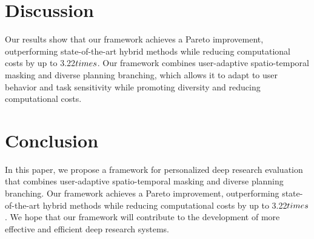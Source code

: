 \documentclass{article}
\begin{document}
\section{Discussion}

Our results show that our framework achieves a Pareto improvement, outperforming state-of-the-art hybrid methods while reducing computational costs by up to 3.22$\\times$. Our framework combines user-adaptive spatio-temporal masking and diverse planning branching, which allows it to adapt to user behavior and task sensitivity while promoting diversity and reducing computational costs.

\section{Conclusion}

In this paper, we propose a framework for personalized deep research evaluation that combines user-adaptive spatio-temporal masking and diverse planning branching. Our framework achieves a Pareto improvement, outperforming state-of-the-art hybrid methods while reducing computational costs by up to 3.22$\\times$. We hope that our framework will contribute to the development of more effective and efficient deep research systems.
\end{document}
